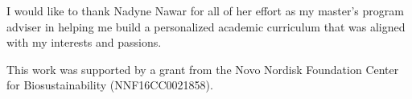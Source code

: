 \begin{frontmatter}
\begin{acknowledgements}
I would like to thank Nadyne Nawar for all of her effort as my master's program adviser in helping me build a personalized academic curriculum that was aligned with my interests and passions.

This work was supported by a grant from the Novo Nordisk Foundation Center for Biosustainability (NNF16CC0021858).

\end{acknowledgements}

%
%
\begin{abstract}

\end{abstract}
\end{frontmatter}
